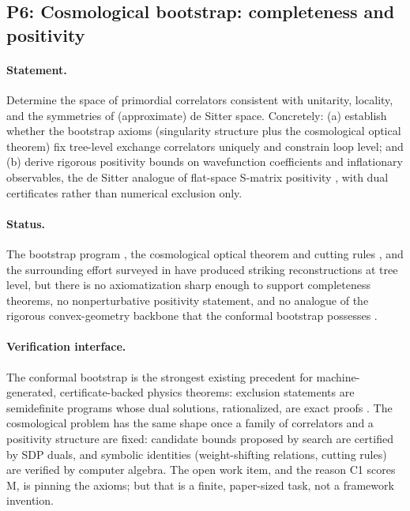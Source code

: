 \documentclass[11pt,letterpaper]{article}
\newcommand{\MM}{M}
\begin{document}
\subsection{P6: Cosmological bootstrap: completeness and positivity}
\label{sec:p6}

\paragraph{Statement.} Determine the space of primordial correlators consistent with unitarity, locality, and the symmetries of (approximate) de Sitter space. Concretely: (a) establish whether the bootstrap axioms (singularity structure plus the cosmological optical theorem) fix tree-level exchange correlators uniquely and constrain loop level; and (b) derive rigorous positivity bounds on wavefunction coefficients and inflationary observables, the de Sitter analogue of flat-space S-matrix positivity \cite{adams2006}, with dual certificates rather than numerical exclusion only.

\paragraph{Status.} The bootstrap program \cite{ablp2020}, the cosmological optical theorem and cutting rules \cite{goodhew2021}, and the surrounding effort surveyed in \cite{snowmass2022} have produced striking reconstructions at tree level, but there is no axiomatization sharp enough to support completeness theorems, no nonperturbative positivity statement, and no analogue of the rigorous convex-geometry backbone that the conformal bootstrap possesses \cite{polandrychkov2019}.

\paragraph{Verification interface.} The conformal bootstrap is the strongest existing precedent for machine-generated, certificate-backed physics theorems: exclusion statements are semidefinite programs whose dual solutions, rationalized, are exact proofs \cite{sdpb2015,polandrychkov2019}. The cosmological problem has the same shape once a family of correlators and a positivity structure are fixed: candidate bounds proposed by search are certified by SDP duals, and symbolic identities (weight-shifting relations, cutting rules) are verified by computer algebra. The open work item, and the reason C1 scores \MM{}, is pinning the axioms; but that is a finite, paper-sized task, not a framework invention.
\end{document}
